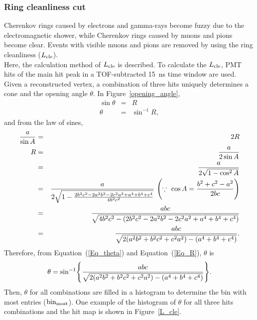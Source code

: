 \subsubsection{Ring cleanliness cut}\label{Sec_ring}
\vs\hs
Cherenkov rings caused by electrons and gamma-rays become fuzzy due to the electromagnetic shower, while Cherenkov rings caused by muons and pions become clear.
Events with visible muons and pions are removed by using the ring cleanliness ($L_{\rm cle}$).\\
\hs
Here, the calculation method of $L_{\rm cle}$ is described.
To calculate the $L_{\rm cle}$, PMT hits of the main hit peak in a TOF-subtracted 15~ns time window are used.
Given a reconstructed vertex, a combination of three hits uniquely determines a cone and the opening angle $\theta$.
In Figure~\ref{opening_angle},
\begin{eqnarray}
	\sin\theta &=& R \nonumber \\
	    \theta &=& \sin^{-1}R, \label{Eq_theta}
\end{eqnarray}
and from the law of sines,
\begin{eqnarray}
	{a \over \sin{A}} &=& 2R \nonumber \\
	                R &=& {a \over 2\sin{A}} \nonumber \\
	                  &=& {a \over 2\sqrt{1 - \cos^{2}A}} \nonumber \\
	                  &=& {a \over 2\sqrt{1 - {2b^{2}c^{2} - 2a^{2}b^{2} - 2c^{2}a^{2} + a^{4} + b^{4} + c^{4} \over 4b^{2}c^{2}}}}\,\,\Biggl(\because\,\,\cos{A} = {b^{2} + c^{2} - a^{2} \over 2bc}\Biggr) \nonumber \\
	                  &=& {abc \over \sqrt{4b^{2}c^{2} - (2b^{2}c^{2} - 2a^{2}b^{2} - 2c^{2}a^{2} + a^{4} + b^{4} + c^{4})}} \nonumber \\
	                  &=& {abc \over \sqrt{2(a^{2}b^{2} + b^{2}c^{2} + c^{2}a^{2}) - (a^{4} + b^{4} + c^{4})}}. \label{Eq_R}
\end{eqnarray}
Therefore, from Equation~(\ref{Eq_theta}) and Equation~(\ref{Eq_R}), $\theta$ is
\begin{eqnarray}
	\theta = \sin^{-1}\Biggl\{{abc \over \sqrt{2(a^{2}b^{2} + b^{2}c^{2} + c^{2}a^{2}) - (a^{4} + b^{4} + c^{4})}}\Biggr\}.
\end{eqnarray}
Then, $\theta$ for all combinations are filled in a histogram to determine the bin with most entries (${\rm bin}_{\rm most}$).
One example of the histogram of $\theta$ for all three hits combinations and the hit map is shown in Figure~\ref{L_cle}.
